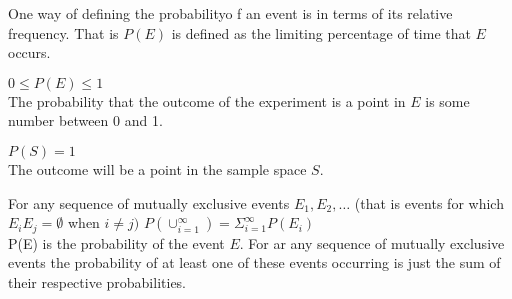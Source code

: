\documentclass[11pt]{article} %
\newenvironment{definition}[1][Definition]{\begin{trivlist}
\item[\hskip \labelsep {\bfseries #1}]}{\end{trivlist}}
\newenvironment{axiom}[1][Axiom]{\begin{trivlist}
\item[\hskip \labelsep {\bfseries #1}]}{\end{trivlist}}
\begin{document}
\begin{definition}
	One way of defining the probabilityo f an event is in terms of its relative frequency. That is $P(E)$ is defined as the limiting percentage of time that $E$ occurs. 
\end{definition}

\begin{axiom}
	$ 0 \leq P(E) \leq 1$ \\
The probability that the outcome of the experiment is a point in $E$ is some number between 0 and 1.
\end{axiom}

\begin{axiom}
	$ P(S) = 1 $ \\
The outcome will be a point in the sample space $S$. 
\end{axiom}

\begin{axiom}
	For any sequence of mutually exclusive events $E_1, E_2, \ldots $ (that is events for which $E_iE_j = \emptyset$ when $i \neq j)$
	{\center
		$P(\cup_{i = 1}^{\infty}) = \Sigma_{i =1}^{\infty}{P(E_i)}$ \\
	} P(E) is the probability of the event $E$. For ar any sequence of mutually exclusive events the probability of at least one of these events occurring is just the sum of their respective probabilities. 
\end{axiom}
\end{document}
